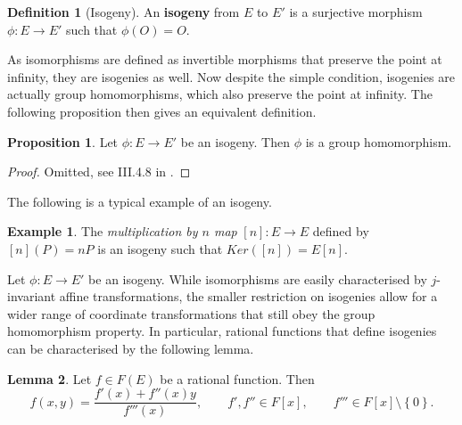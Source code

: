 \documentclass{article}
\newcommand{\rb}[1]{\left( #1 \right)}
\renewcommand{\sb}[1]{\left[ #1 \right]}
\newcommand{\cb}[1]{\left\{ #1 \right\}}
\theoremstyle{definition}\newtheorem*{definition}{Definition}
\theoremstyle{definition}\newtheorem*{example}{Example}
\theoremstyle{definition}\newtheorem*{remark}{Remark}
\newtheorem{proposition}{Proposition}[subsection]
\newtheorem{lemma}[proposition]{Lemma}
\begin{document}
\begin{definition}[Isogeny]
An \textbf{isogeny} from $ E $ to $ E' $ is a surjective morphism $ \phi : E \to E' $ such that $ \phi\rb{O} = O $.
\end{definition}

As isomorphisms are defined as invertible morphisms that preserve the point at infinity, they are isogenies as well. Now despite the simple condition, isogenies are actually group homomorphisms, which also preserve the point at infinity. The following proposition then gives an equivalent definition.

\begin{proposition}
Let $ \phi : E \to E' $ be an isogeny. Then $ \phi $ is a group homomorphism.
\end{proposition}

\begin{proof}
Omitted, see III.4.8 in \cite{gtm}.
\end{proof}

The following is a typical example of an isogeny.

\begin{example}
The \emph{multiplication by $ n $ map} $ \sb{n} : E \to E $ defined by $ \sb{n}\rb{P} = nP $ is an isogeny such that $ Ker\rb{\sb{n}} = E\sb{n} $.
\end{example}

Let $ \phi : E \to E' $ be an isogeny. While isomorphisms are easily characterised by $ j $-invariant affine transformations, the smaller restriction on isogenies allow for a wider range of coordinate transformations that still obey the group homomorphism property. In particular, rational functions that define isogenies can be characterised by the following lemma.

\begin{lemma}
Let $ f \in F\rb{E} $ be a rational function. Then
$$ f\rb{x, y} = \dfrac{f'\rb{x} + f''\rb{x}y}{f'''\rb{x}}, \qquad f', f'' \in F\sb{x}, \qquad f''' \in F\sb{x} \setminus \cb{0}. $$
\end{lemma}
\end{document}
